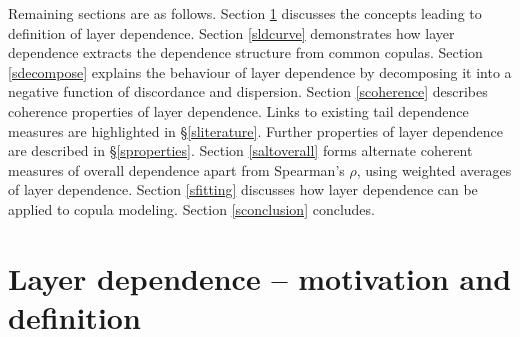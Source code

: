 \documentclass[authoryear]{elsarticle}
\newcommand{\sref}[1]{\S\ref{#1}}
\newcommand{\aref}[1]{\ref{#1}}
\begin{document}
Remaining sections are as follows. Section \aref{sintroduction} discusses the concepts leading to definition of layer dependence. Section \aref{sldcurve} demonstrates how layer dependence extracts the dependence structure from common copulas. Section \aref{sdecompose} explains the behaviour of layer dependence by decomposing it into a negative function of discordance and dispersion. Section \aref{scoherence} describes coherence properties of layer dependence. Links to existing tail dependence measures are highlighted in  \sref{sliterature}. Further properties of layer dependence are described in  \sref{sproperties}. Section \aref{saltoverall} forms alternate coherent measures of overall dependence apart from Spearman's $\rho$, using weighted averages of layer dependence. Section \aref{sfitting} discusses how layer dependence can be applied to copula modeling. Section \aref{sconclusion} concludes.

\section{Layer dependence -- motivation and definition}\label{sintroduction}
\end{document}
